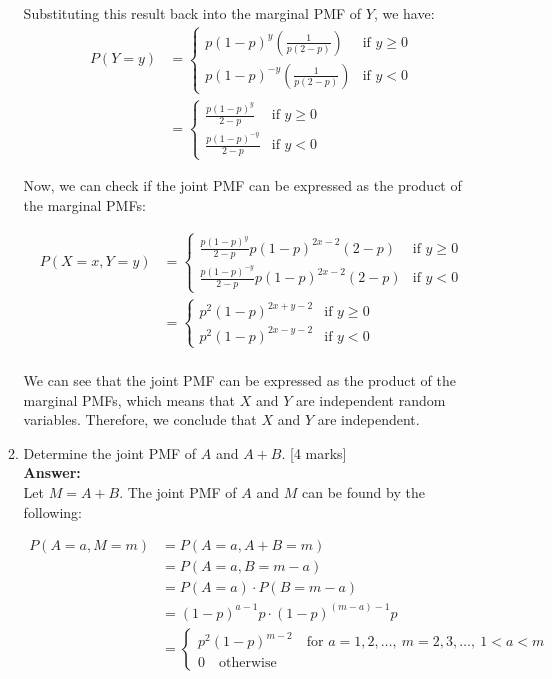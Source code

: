 \documentclass[12pt]{article}
\begin{document}
\begin{enumerate}
\begin{enumerate}
Substituting this result back into the marginal PMF of $Y$, we have:
\begin{align*}
P(Y=y) &= \begin{cases}
p(1-p)^{y} \left(\frac{1}{p(2-p)}\right) & \text{if } y \geq 0 \\
p(1-p)^{-y} \left(\frac{1}{p(2-p)}\right) & \text{if } y < 0
\end{cases} \\
&= \begin{cases}
\frac{p(1-p)^{y}}{2-p} & \text{if } y \geq 0 \\
\frac{p(1-p)^{-y}}{2-p} & \text{if } y < 0
\end{cases}
\end{align*}

Now, we can check if the joint PMF can be expressed as the product of the marginal PMFs:

\begin{align*}
P(X=x, Y=y) &= \begin{cases}
\frac{p(1-p)^{y}}{2-p} p(1-p)^{2x-2} \left( 2-p \right) & \text{if } y \geq 0 \\
\frac{p(1-p)^{-y}}{2-p} p(1-p)^{2x-2} \left( 2-p \right) & \text{if } y < 0
\end{cases} \\
&= \begin{cases}
p^2(1-p)^{2x+y-2} & \text{if } y \geq 0 \\
p^2(1-p)^{2x-y-2} & \text{if } y < 0
\end{cases} \\
\end{align*}

We can see that the joint PMF can be expressed as the product of the marginal PMFs, which means that $X$ and $Y$ are independent random variables. Therefore, we conclude that $X$ and $Y$ are independent.
%

\item Determine the joint PMF of $A$ and $A+B$. 
			\hfill [4 marks]
%
\\
\textbf{Answer:}
\\
Let $M = A + B$. The joint PMF of $A$ and $M$ can be found by the following:

\begin{align*}
P(A=a, M=m) &= P(A=a, A+B=m) \\
&= P(A=a, B=m-a) \\
&= P(A=a) \cdot P(B=m-a) \\
&= (1-p)^{a-1}p \cdot (1-p)^{(m-a)-1}p \\
&= \begin{cases}
p^2(1-p)^{m-2} \quad \text{for } a=1,2,\ldots,\ m=2,3,\ldots,\ 1 < a < m \\
0 \quad \text{otherwise}
\end{cases} \\
\end{align*}
%


\end{enumerate}
\end{enumerate}
\end{document}
